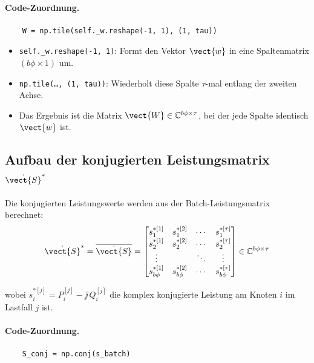 \paragraph{Code-Zuordnung.}
\begin{verbatim}
	W = np.tile(self._w.reshape(-1, 1), (1, tau))
\end{verbatim}

\begin{itemize}
	\item \texttt{self.\_w.reshape(-1, 1)}: Formt den Vektor $\vect{w}$ in eine Spaltenmatrix $(b\phi \times 1)$ um.
	\item \texttt{np.tile(\ldots, (1, tau))}: Wiederholt diese Spalte $\tau$-mal entlang der zweiten Achse.
	\item Das Ergebnis ist die Matrix $\vect{W} \in \mathbb{C}^{b\phi \times \tau}$, bei der jede Spalte identisch $\vect{w}$ ist.
\end{itemize}

\subsection{Aufbau der konjugierten Leistungsmatrix $\dot{\vect{S}}^*$}
\label{subsec:s_conj}

Die konjugierten Leistungswerte werden aus der Batch-Leistungsmatrix berechnet:
\begin{equation}
	\dot{\vect{S}}^* = \overline{\dot{\vect{S}}} = 
	\begin{bmatrix}
		s_1^{*[1]} & s_1^{*[2]} & \cdots & s_1^{*[\tau]} \\
		s_2^{*[1]} & s_2^{*[2]} & \cdots & s_2^{*[\tau]} \\
		\vdots & & \ddots & \vdots \\
		s_{b\phi}^{*[1]} & s_{b\phi}^{*[2]} & \cdots & s_{b\phi}^{*[\tau]}
	\end{bmatrix}
	\in \mathbb{C}^{b\phi \times \tau}
	\label{eq:S_conj_matrix}
\end{equation}

wobei $s_i^{*[j]} = P_i^{[j]} - \jj\, Q_i^{[j]}$ die komplex konjugierte Leistung am Knoten $i$ im Lastfall $j$ ist.

\paragraph{Code-Zuordnung.}
\begin{verbatim}
	S_conj = np.conj(s_batch)
\end{verbatim}

